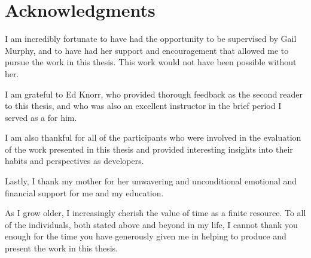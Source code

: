 
\chapter{Acknowledgments}

I am incredibly fortunate to have had the opportunity to be supervised by Gail Murphy,
and to have had her support and encouragement that allowed me to pursue the work in this thesis.
This work would not have been possible without her.

I am grateful to Ed Knorr, who provided thorough feedback as the second reader to this thesis,
and who was also an excellent instructor in the brief period I served as a  for him.

I am also thankful for all of the participants who were involved in the evaluation of the work presented in this thesis
and provided interesting insights into their habits and perspectives as developers.

Lastly, I thank my mother for her unwavering and unconditional emotional and financial support for me and my education.

As I grow older, I increasingly cherish the value of time as a finite resource.
To all of the individuals, both stated above and beyond in my life,
I cannot thank you enough for the time you have generously given me in helping to produce and present the work in this thesis.